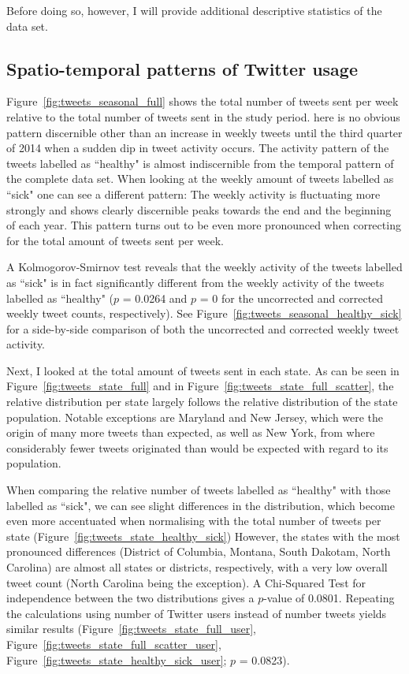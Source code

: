\documentclass[11pt, a4paper,twoside]{report}\usepackage[]{graphicx}\usepackage[]{color}
\begin{document}
Before doing so, however, I will provide additional descriptive statistics of the data set.

\subsection{Spatio-temporal patterns of Twitter usage}

Figure~\ref{fig:tweets_seasonal_full} shows the total number of tweets sent per week relative to the total number of tweets sent in the study period. here is no obvious pattern discernible other than an increase in weekly tweets until the third quarter of 2014 when a sudden dip in tweet activity occurs. The activity pattern of the tweets labelled as ``healthy" is almost indiscernible from the temporal pattern of the complete data set. When looking at the weekly amount of tweets labelled as ``sick" one can see a different pattern: The weekly activity is fluctuating more strongly and shows clearly discernible peaks towards the end and the beginning of each year. This pattern turns out to be even more pronounced when correcting for the total amount of tweets sent per week.

A Kolmogorov-Smirnov test reveals that the weekly activity of the tweets labelled as ``sick" is in fact significantly different from the weekly activity of the tweets labelled as ``healthy" ($p$ = 0.0264 and $p$ = 0 for the uncorrected and corrected weekly tweet counts, respectively). See Figure~\ref{fig:tweets_seasonal_healthy_sick} for a side-by-side comparison of both the uncorrected and corrected weekly tweet activity.

Next, I looked at the total amount of tweets sent in each state. As can be seen in Figure~\ref{fig:tweets_state_full} and in Figure~\ref{fig:tweets_state_full_scatter}, the relative distribution per state largely follows the relative distribution of the state population. Notable exceptions are Maryland and New Jersey, which were the origin of many more tweets than expected, as well as New York, from where considerably fewer tweets originated than would be expected with regard to its population.

When comparing the relative number of tweets labelled as ``healthy" with those labelled as ``sick", we can see slight differences in the distribution, which become even more accentuated when normalising with the total number of tweets per state (Figure~\ref{fig:tweets_state_healthy_sick}) However, the states with the most pronounced differences (District of Columbia, Montana, South Dakotam, North Carolina) are almost all states or districts, respectively, with a very low overall tweet count (North Carolina being the exception). A Chi-Squared Test for independence between the two distributions gives a $p$-value of 0.0801. Repeating the calculations using number of Twitter users instead of number tweets yields similar results (Figure~\ref{fig:tweets_state_full_user}, Figure~\ref{fig:tweets_state_full_scatter_user}, Figure~\ref{fig:tweets_state_healthy_sick_user}; $p$ = 0.0823).\newpage
\end{document}
